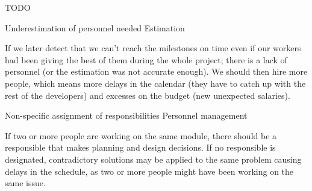 TODO
\begin{risk}[riskPersonnelUnderestimation]{Underestimation of personnel needed}
\riskcat Estimation

If we later detect that we can't reach the milestones on time even if our workers had been giving the best of them during the whole project; there is a lack of personnel (or the estimation was not accurate enough). We should then hire more people, which means more delays in the calendar (they have to catch up with the rest of the developers) and excesses on the budget (new unexpected salaries).
\end{risk}

\begin{risk}[riskResponsibilitesAssignment]{Non-specific assignment of responsibilities}
\riskcat Personnel management

If two or more people are working on the same module, there should be a responsible that makes planning and design decisions. If no responsible is designated, contradictory solutions may be applied to the same problem causing delays in the schedule, as two or more people might have been working on the same issue.
\end{risk}
